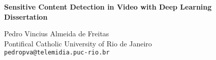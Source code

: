 \documentclass[11pt]{article}
\begin{document}
\LARGE


\begin{center}
{\bf Sensitive Content Detection in Video with Deep Learning
\Large
\\Dissertation}
\end{center}


\bigskip
\normalsize

\begin{flushright}

Pedro Vincius Almeida de Freitas\\
Pontifical Catholic University of Rio de Janeiro\\
\texttt{pedropva@telemidia.puc-rio.br}
\end{flushright}


\date{}


\thispagestyle{empty}

%
%

{} \setcounter{page}{-1}

\tableofcontents

\newpage
{} \setcounter{page}{1}










\newpage


% 



\end{document}
